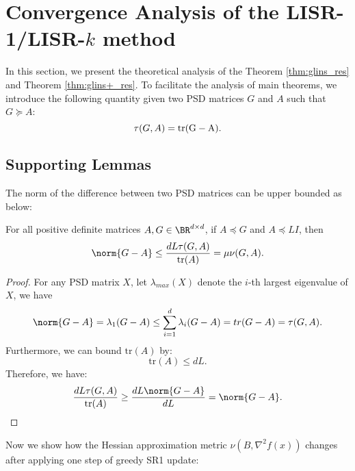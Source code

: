 \section{Convergence Analysis of the LISR-1/LISR-$k$ method} \label{appendix:main_result_proof}
In this section, we present the theoretical analysis of the Theorem \ref{thm:glins_res} and Theorem \ref{thm:glins+_res}.
To facilitate the analysis of main theorems, we introduce the following quantity given two PSD matrices $G$ and $A$ such that $G \succeq A$:
\begin{equation*}
    \tau(G, A) = \rm tr(G - A).
\end{equation*}
\subsection{Supporting Lemmas}
The norm of the difference between two PSD matrices can be upper bounded as below:
\begin{lemma}
    For all positive definite matrices $A, G \in \BR^{d \times d}$, if $A \preceq G$ and $A \preceq L I$, then
    \begin{equation*}
        \norm{G - A} \leq \frac{d L \tau(G, A)}{\mathrm{tr}(A)} = \mu \nu(G, A).
    \end{equation*}
    \label{lemma:norm_bound}
\end{lemma}
\begin{proof}
    For any PSD matrix $X$, let $\lambda_{max}(X)$ denote the $i$-th largest eigenvalue of $X$, we have
    \begin{align*}
        \norm{G - A} = \lambda_1(G- A) \leq \sum_{i=1}^d \lambda_i(G - A) = tr(G - A) = \tau(G, A).
    \end{align*}
    Furthermore, we can bound $\mathrm{tr}(A)$ by:
    \begin{equation*}
        \mathrm{tr}(A) \leq d L.
    \end{equation*}
    Therefore, we have:
    \begin{equation*}
        \frac{d L \tau(G, A)}{\mathrm{tr}(A)} \geq \frac{d L \norm{G - A}}{d L} = \norm{G - A}.
    \end{equation*}
\end{proof}
Now we show how the Hessian approximation metric $\nu(B, \nabla^2 f(x))$ changes after applying one step of greedy SR1 update:
